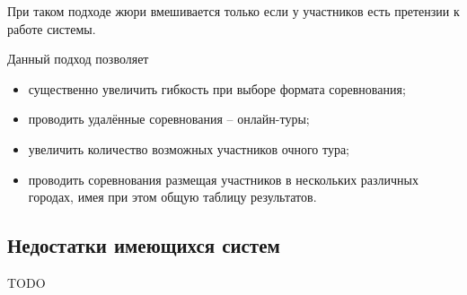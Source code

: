 При таком подходе жюри вмешивается только если у участников есть претензии к работе системы.

Данный подход позволяет
\begin{itemize}
	\item существенно увеличить гибкость при выборе формата соревнования;
	\item проводить удалённые соревнования -- онлайн-туры;
	\item увеличить количество возможных участников очного тура;
	\item проводить соревнования размещая участников в нескольких различных городах,
		имея при этом общую таблицу результатов.
\end{itemize}

\subsection{Недостатки имеющихся систем}
TODO